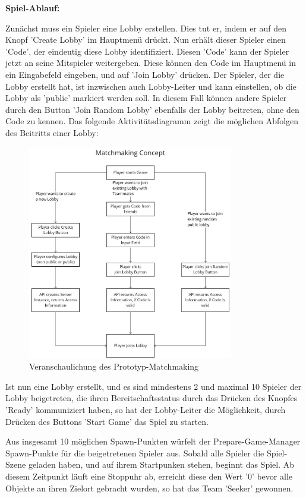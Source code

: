 \textbf{Spiel-Ablauf:}

Zunächst muss ein Spieler eine Lobby erstellen. Dies tut er, indem er auf den Knopf 'Create Lobby' im Hauptmenü drückt. Nun erhält dieser Spieler einen 'Code', der eindeutig diese Lobby identifiziert. Diesen 'Code' kann der Spieler jetzt an seine Mitspieler weitergeben. Diese können den Code im Hauptmenü in ein Eingabefeld eingeben, und auf 'Join Lobby' drücken. Der Spieler, der die Lobby erstellt hat, ist inzwischen auch Lobby-Leiter und kann einstellen, ob die Lobby als 'public' markiert werden soll. In diesem Fall können andere Spieler durch den Button 'Join Random Lobby' ebenfalls der Lobby beitreten, ohne den Code zu kennen. Das folgende Aktivitätsdiagramm zeigt die möglichen Abfolgen des Beitritts einer Lobby:

\begin{figure}[H]
	\centering
	\includegraphics[width=90mm]{images/matchmaking_concept.jpg}
	\caption[Matchmaking-Konzept Diagramm]{Veranschaulichung des Prototyp-Matchmaking}
	\label{pic:matchmaking_concept}
\end{figure}

Ist nun eine Lobby erstellt, und es sind mindestens 2 und maximal 10 Spieler der Lobby beigetreten, die ihren Bereitschaftsstatus durch das Drücken des Knopfes 'Ready' kommuniziert haben, so hat der Lobby-Leiter die Möglichkeit, durch Drücken des Buttons 'Start Game' das Spiel zu starten.

Aus insgesamt 10 möglichen Spawn-Punkten würfelt der Prepare-Game-Manager Spawn-Punkte für die beigetretenen Spieler aus. Sobald alle Spieler die Spiel-Szene geladen haben, und auf ihrem Startpunken stehen, beginnt das Spiel. Ab diesem Zeitpunkt läuft eine Stoppuhr ab, erreicht diese den Wert '0' bevor alle Objekte an ihren Zielort gebracht wurden, so hat das Team 'Seeker' gewonnen.

